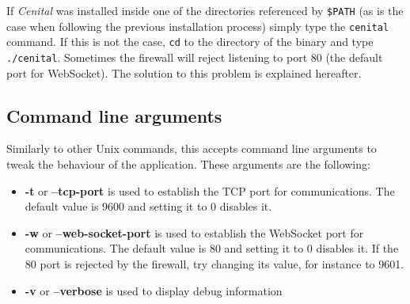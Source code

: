 \documentclass[../main.tex]{subfiles}
\begin{document}
If \textit{Cenital} was installed inside one of the directories referenced by \texttt{\$PATH} (as is the case when following the previous installation process) simply type the \texttt{cenital} command. If this is not the case,  \texttt{cd} to the directory of the binary and type \texttt{./cenital}. Sometimes the firewall will reject listening to port 80 (the default port for WebSocket). The solution to this problem is explained hereafter.

\subsection{Command line arguments}
Similarly to other Unix commands, this accepts command line arguments to tweak the behaviour of the application. These arguments are the following:

\begin{itemize}
    \item \textbf{-t} or \textbf{--tcp-port} is used to establish the TCP port for communications. The default value is 9600 and setting it to 0 disables it.
    \item \textbf{-w} or \textbf{--web-socket-port} is used to establish the WebSocket port for communications. The default value is 80 and setting it to 0 disables it. If the 80 port is rejected by the firewall, try changing its value, for instance to 9601.
    \item \textbf{-v} or \textbf{--verbose} is used to display debug information
\end{itemize}
\end{document}
